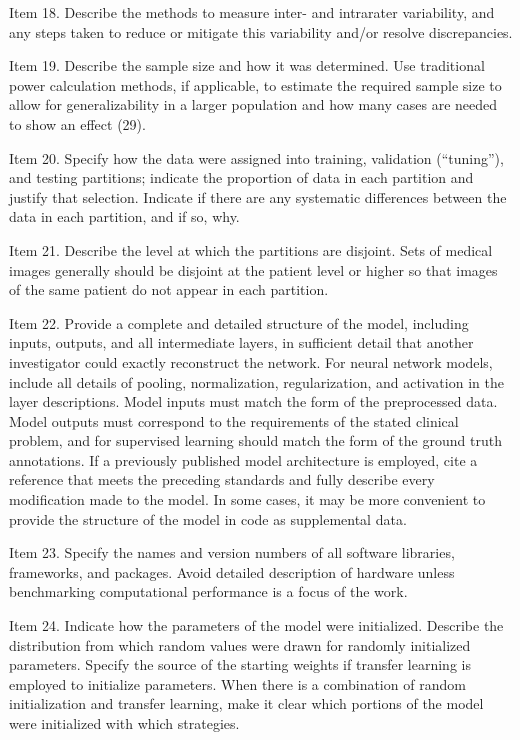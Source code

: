 Item 18. Describe the methods to measure inter- and intrarater variability, and any steps taken to reduce or mitigate this variability and/or resolve discrepancies.

Item 19. Describe the sample size and how it was determined. Use traditional power calculation methods, if applicable, to estimate the required sample size to allow for generalizability in a larger population and how many cases are needed to show an effect (29).

Item 20. Specify how the data were assigned into training, validation (“tuning”), and testing partitions; indicate the proportion of data in each partition and justify that selection. Indicate if there are any systematic differences between the data in each partition, and if so, why.

Item 21. Describe the level at which the partitions are disjoint. Sets of medical images generally should be disjoint at the patient level or higher so that images of the same patient do not appear in each partition.

Item 22. Provide a complete and detailed structure of the model, including inputs, outputs, and all intermediate layers, in sufficient detail that another investigator could exactly reconstruct the network. For neural network models, include all details of pooling, normalization, regularization, and activation in the layer descriptions. Model inputs must match the form of the preprocessed data. Model outputs must correspond to the requirements of the stated clinical problem, and for supervised learning should match the form of the ground truth annotations. If a previously published model architecture is employed, cite a reference that meets the preceding standards and fully describe every modification made to the model. In some cases, it may be more convenient to provide the structure of the model in code as supplemental data.

Item 23. Specify the names and version numbers of all software libraries, frameworks, and packages. Avoid detailed description of hardware unless benchmarking computational performance is a focus of the work.

Item 24. Indicate how the parameters of the model were initialized. Describe the distribution from which random values were drawn for randomly initialized parameters. Specify the source of the starting weights if transfer learning is employed to initialize parameters. When there is a combination of random initialization and transfer learning, make it clear which portions of the model were initialized with which strategies.

